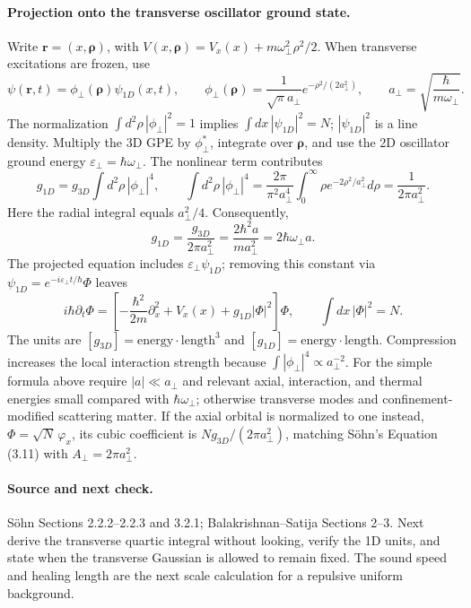 \paragraph{Projection onto the transverse oscillator ground state.}
Write $\mathbf r=(x,\boldsymbol\rho)$, with
$V(x,\boldsymbol\rho)=V_x(x)+m\omega_\perp^2\rho^2/2$.
When transverse excitations are frozen, use
\[
\psi(\mathbf r,t)=\phi_\perp(\boldsymbol\rho)\psi_{1D}(x,t),\qquad
\phi_\perp(\boldsymbol\rho)=\frac1{\sqrt\pi a_\perp}e^{-\rho^2/(2a_\perp^2)},\qquad
a_\perp=\sqrt{\frac\hbar{m\omega_\perp}}.
\]
The normalization $\int d^2\rho\,|\phi_\perp|^2=1$ implies
$\int dx\,|\psi_{1D}|^2=N$; $|\psi_{1D}|^2$ is a line density. Multiply the 3D GPE by $\phi_\perp^*$, integrate over $\boldsymbol\rho$, and use the 2D oscillator ground energy $\varepsilon_\perp=\hbar\omega_\perp$. The nonlinear term contributes
\[
g_{1D}=g_{3D}\int d^2\rho\,|\phi_\perp|^4,
\qquad
\int d^2\rho\,|\phi_\perp|^4
=\frac{2\pi}{\pi^2 a_\perp^4}
\int_0^\infty\rho e^{-2\rho^2/a_\perp^2}d\rho
=\frac1{2\pi a_\perp^2}.
\]
Here the radial integral equals $a_\perp^2/4$. Consequently,
\[
\boxed{g_{1D}=\frac{g_{3D}}{2\pi a_\perp^2}
=\frac{2\hbar^2a}{ma_\perp^2}=2\hbar\omega_\perp a}.
\]
The projected equation includes $\varepsilon_\perp\psi_{1D}$; removing this constant via $\psi_{1D}=e^{-i\varepsilon_\perp t/\hbar}\Phi$ leaves
\[
\boxed{i\hbar\partial_t\Phi=
\left[-\frac{\hbar^2}{2m}\partial_x^2+V_x(x)+g_{1D}|\Phi|^2\right]\Phi},
\qquad \int dx\,|\Phi|^2=N.
\]
The units are $[g_{3D}]=\mathrm{energy}\cdot\mathrm{length}^3$ and
$[g_{1D}]=\mathrm{energy}\cdot\mathrm{length}$. Compression increases the local interaction strength because $\int|\phi_\perp|^4\propto a_\perp^{-2}$. For the simple formula above require $|a|\ll a_\perp$ and relevant axial, interaction, and thermal energies small compared with $\hbar\omega_\perp$; otherwise transverse modes and confinement-modified scattering matter. If the axial orbital is normalized to one instead, $\Phi=\sqrt N\,\varphi_x$, its cubic coefficient is $Ng_{3D}/(2\pi a_\perp^2)$, matching S\"ohn's Equation (3.11) with $A_\perp=2\pi a_\perp^2$.

\paragraph{Source and next check.}
S\"ohn Sections 2.2.2--2.2.3 and 3.2.1; Balakrishnan--Satija Sections 2--3. Next derive the transverse quartic integral without looking, verify the 1D units, and state when the transverse Gaussian is allowed to remain fixed. The sound speed and healing length are the next scale calculation for a repulsive uniform background.
